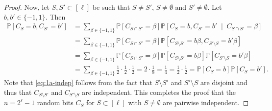 \documentclass[letterpaper, reqno,11pt]{article}
\newcommand{\PP}{\mathbb{P}}
\begin{document}
\begin{enumerate}
\begin{enumerate}
\begin{proof}
      Now, let $S, S' \subset [\ell]$ be such that $S \neq S'$, $S \neq \emptyset$ and $S' \neq \emptyset$. Let $b, b' \in \{ -1, 1 \}$. Then
      \begin{align}
        \PP\left[C_S = b, C_{S'} = b'\right] &= \sum_{\beta \in \{ -1, 1 \}} \PP\left[C_{S \cap S'} = \beta\right] \PP\left[C_S = b, C_{S'} = b' \;\middle|\; C_{S \cap S'} = \beta\right] \nonumber \\
        &= \sum_{\beta \in \{ -1, 1 \}} \PP\left[C_{S \cap S'} = \beta\right] \PP\left[C_{S \setminus S'} = b \beta, C_{S' \setminus S} = b' \beta\right] \nonumber \\
        &= \sum_{\beta \in \{ -1, 1 \}} \PP\left[C_{S \cap S'} = \beta\right] \PP\left[C_{S \setminus S'} = b \beta\right] \PP\left[C_{S' \setminus S} = b' \beta\right] \label{eq:1a-indep} \\
        &= \sum_{\beta \in \{ -1, 1 \}} \frac{1}{2} \cdot \frac{1}{2} \cdot \frac{1}{2} = 2 \cdot \frac{1}{8} = \frac{1}{4} = \frac{1}{2} \cdot \frac{1}{2} = \PP\left[C_S = b\right] \PP\left[C_S = b'\right]. \nonumber
      \end{align}
      Note that \eqref{eq:1a-indep} follows from the fact that $S \setminus S'$ and $S' \setminus S$ are disjoint and thus that $C_{S \setminus S'}$ and $C_{S' \setminus S}$ are independent. This completes the proof that the $n = 2^{\ell} - 1$ random bits $C_S$ for $S \subset [\ell]$ with $S \neq \emptyset$ are pairwise independent.
    \end{proof}
  \end{enumerate}
\end{enumerate}
\end{document}
